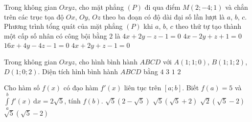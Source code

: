 \begin{ex}%
	Trong không gian $Oxyz$, cho mặt phẳng  $\left(P\right)$ đi qua điểm $M\left(2; - 4; 1\right)$  và chắn trên các trục tọa độ $Ox$, $Oy$, $Oz$ theo ba đoạn có độ dài đại số lần lượt là $a$, $b$, $c$. Phương trình tổng quát của mặt phẳng $\left(P\right)$ khi $a$, $b$, $c$ theo thứ tự tạo thành một cấp số nhân có công bội bằng $2$ là 
	\choice
	{$4x + 2y - z - 1 = 0$}
	{$4x -  2y + z +  1 = 0$}
	{$16x + 4y - 4z - 1 = 0$}
	{\True $4x + 2y +  z - 1 = 0$}
\end{ex}

\begin{ex}%
	Trong không gian $Oxyz$, cho hình bình hành $ABCD$ với  $A\left(1;1;0\right)$, $B\left(1; 1; 2\right)$, $D\left(1; 0; 2\right)$. Diện tích hình bình hành $ABCD$ bằng 
	\choice
	{$4$}
	{$3$}
	{$1$}
	{\True $2$}
\end{ex}


\begin{ex}%
Cho hàm số $f\left(x\right)$ có đạo hàm $f'\left(x\right)$ liên tục trên $\left[a; b\right]$. Biết $f\left(a\right) = 5$  và  $\displaystyle\int\limits_{a}^{b}f'\left(x\right)\, \mathrm{d}x = 2\sqrt{5}$, tính  $f\left(b\right)$.
	\choice
	{$\sqrt{5}\left(2 - \sqrt{5}\right)$}
	{\True $\sqrt{5}\left(\sqrt{5} + 2\right)$}
	{$\sqrt{2}\left(\sqrt{5} - 2\right)$}
	{$\sqrt{5}\left(\sqrt{5} - 2\right)$}
\end{ex}


